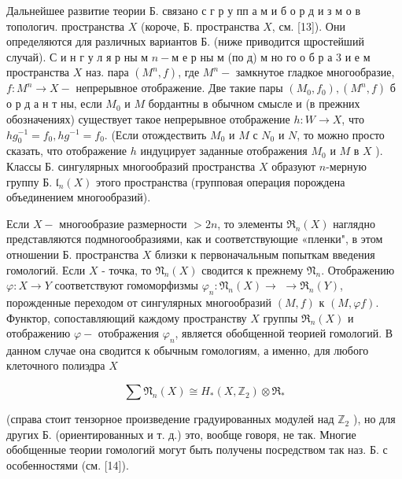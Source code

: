 \documentclass[10pt]{article}
\begin{document}
Дальнейшее развитие теории Б. связано с г р у пп а м и б о р д и з м о в топологич. пространства $X$ (короче, Б. пространства $X$, см. [13]). Они определяются для различных вариантов Б. (ниже приводится щростейший случай). С и н г у л я р ны м $n-м$ е р ны м (по д) м но го о б р а 3 и е м пространства $X$ наз. пара $\left(M^{n}, f\right)$, где $M^{n}-$ замкнутое гладкое многообразие, $f: M^{n} \rightarrow X-$ непрерывное отображение. Две такие пары $\left(M_{0}, f_{0}\right),\left(M^{n}, f\right)$ б о р д а н т ны, если $M_{0}$ и $M$ бордантны в обычном смысле и (в прежних обозначениях) существует такое непрерывное отображение $h: W \rightarrow X$, что $h g_{0}^{-1}=f_{0}, h g^{-1}=f_{0}$. (Если отождествить $M_{0}$ и $M$ с $N_{0}$ и $N$, то можно просто сказать, что отображение $h$ индуцирует заданные отображения $M_{0}$ и $M$ в $X$ ). Классы Б. сингулярных многообразий пространства $X$ образуют $n$-мерную группу Б. $\mathfrak{l}_{n}(X)$ этого пространства (групповая операция порождена объединением многообразий).



Если $X-$ многообразие размерности $>2 n$, то элементы $\mathfrak{R}_{n}(X)$ наглядно представляются подмногообразиями, как и соответствующие «пленки", в этом отношении Б. пространства $X$ близки к первоначальным попыткам введения гомологий. Если $X$ - точка, то $\mathfrak{N}_{n}(X)$ сводится к прежнему $\mathfrak{N}_{n}$. Отображению $\varphi: X \rightarrow Y$ соответствуют гомоморфизмы $\varphi_{n}: \mathfrak{N}_{n}(X) \rightarrow$ $\rightarrow \mathfrak{R}_{n}(Y)$, порожденные переходом от сингулярных многообразий $(M, f)$ к $(M, \varphi f)$. Функтор, сопоставляющий каждому пространству $X$ группы $\Re_{n}(X)$ и отображению $\varphi-$ отображения $\varphi_{n}$, является обобщенной теорией гомологий. В данном случае она сводится к обычным гомологиям, а именно, для любого клеточного полиэдра $X$



\[

\sum \mathfrak{N}_{n}(X) \cong H_{*}\left(X, \mathbb{Z}_{2}\right) \otimes \mathfrak{R}_{*}

\]



(справа стоит тензорное произведение градуированных модулей над $\mathbb{Z}_{2}$ ), но для других Б. (ориентированных и т. д.) это, вообще говоря, не так. Многие обобщенные теории гомологий могут быть получены посредством так наз. Б. с особенностями (см. [14]).
\end{document}

